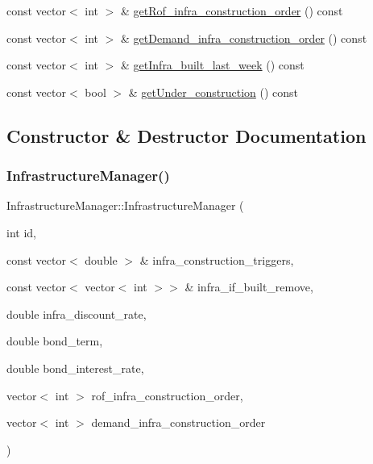 \begin{DoxyCompactItemize}
\item 
const vector$<$ int $>$ \& \mbox{\hyperlink{classInfrastructureManager_a871e836e57ac056fad1e2b71b81ade81}{get\+Rof\+\_\+infra\+\_\+construction\+\_\+order}} () const
\item 
const vector$<$ int $>$ \& \mbox{\hyperlink{classInfrastructureManager_a5766b6aa0d40f316a6ef57df2dcfa198}{get\+Demand\+\_\+infra\+\_\+construction\+\_\+order}} () const
\item 
const vector$<$ int $>$ \& \mbox{\hyperlink{classInfrastructureManager_a2b6b96f3742a18e86ead7b382816e7e8}{get\+Infra\+\_\+built\+\_\+last\+\_\+week}} () const
\item 
const vector$<$ bool $>$ \& \mbox{\hyperlink{classInfrastructureManager_a47d132df65ee88362f996c1b64068f9e}{get\+Under\+\_\+construction}} () const
\end{DoxyCompactItemize}


\subsection{Constructor \& Destructor Documentation}
\mbox{\label{classInfrastructureManager_a2720f467b660e0f63f265e7957ca0139}} 
\subsubsection{\texorpdfstring{Infrastructure\+Manager()}{InfrastructureManager()}\hspace{0.1cm}{\footnotesize\ttfamily [1/3]}}
{\footnotesize\ttfamily Infrastructure\+Manager\+::\+Infrastructure\+Manager (\begin{DoxyParamCaption}\item[{int}]{id,  }\item[{const vector$<$ double $>$ \&}]{infra\+\_\+construction\+\_\+triggers,  }\item[{const vector$<$ vector$<$ int $>$$>$ \&}]{infra\+\_\+if\+\_\+built\+\_\+remove,  }\item[{double}]{infra\+\_\+discount\+\_\+rate,  }\item[{double}]{bond\+\_\+term,  }\item[{double}]{bond\+\_\+interest\+\_\+rate,  }\item[{vector$<$ int $>$}]{rof\+\_\+infra\+\_\+construction\+\_\+order,  }\item[{vector$<$ int $>$}]{demand\+\_\+infra\+\_\+construction\+\_\+order }\end{DoxyParamCaption})}

